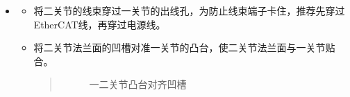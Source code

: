 \documentclass[a4paper,11pt,english,openany,oneside]{sphinxmanual}
\begin{document}
\begin{itemize}
\begin{itemize}
\item {} 
\sphinxAtStartPar
使用2.5mm内六角螺丝刀拧紧1颗固定法兰固线钣金的M3内六角螺钉。
\begin{quote}

\begin{figure}[H]
\centering
\capstart

\noindent{}
\caption{安装法兰固线钣金螺钉}\label{\detokenize{_u66f4_u6362_u5173_u8282:id128}}\end{figure}
\end{quote}

\item {} 
\sphinxAtStartPar
将线圈固定件套在线束热缩管上，并将线圈固定钣金置于散热器上的钣金安装位置上。将1颗M3内六角螺钉置于线圈固定钣金上，使用2.5mm内六角螺丝刀拧紧这颗螺钉。
\begin{quote}

\begin{figure}[H]
\centering
\capstart

\noindent{}
\caption{安装线圈固定件}\label{\detokenize{_u66f4_u6362_u5173_u8282:id129}}\end{figure}
\end{quote}

\item {} 
\sphinxAtStartPar
使用扎带将线圈固定件上方的热缩管扎上，使用斜口钳将多余扎带剪掉，注意剪扎带时切勿剪到线束。

\end{itemize}

\item {} 
\sphinxAtStartPar
{}
\begin{itemize}
\item {} 
\sphinxAtStartPar
将二关节的线束穿过一关节的出线孔，为防止线束端子卡住，推荐先穿过EtherCAT线，再穿过电源线。

\item {} 
\sphinxAtStartPar
将二关节法兰面的凹槽对准一关节的凸台，使二关节法兰面与一关节贴合。
\begin{quote}

\begin{figure}[H]
\centering
\capstart

\noindent{}
\caption{一二关节凸台对齐凹槽}\label{\detokenize{_u66f4_u6362_u5173_u8282:id130}}\end{figure}
\end{quote}


\end{itemize}
\end{itemize}
\end{document}
